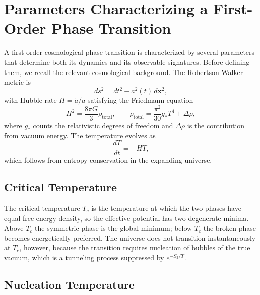 \chapter{Parameters Characterizing a First-Order Phase Transition}
\label{ch:phase-transition-parameters}

A first-order cosmological phase transition is characterized by several
parameters that determine both its dynamics and its observable
signatures. Before defining them, we recall the relevant cosmological
background. The Robertson-Walker metric is
\begin{equation}
	ds^2 = dt^2 - a^2(t)\,d\mathbf{x}^2,
\end{equation}
with Hubble rate $H = \dot a/a$ satisfying the Friedmann equation
\begin{equation}
	H^2 = \frac{8\pi G}{3}\rho_{\text{total}},
	\qquad
	\rho_{\text{total}} = \frac{\pi^2}{30}g_* T^4 + \Delta\rho,
\end{equation}
where $g_*$ counts the relativistic degrees of freedom and $\Delta\rho$
is the contribution from vacuum energy. The temperature evolves as
\begin{equation}
	\frac{dT}{dt} = -HT,
	\label{eq:reference_temperature}
\end{equation}
which follows from entropy conservation in the expanding universe.

\section{Critical Temperature}

The critical temperature $T_c$ is the temperature at which the two
phases have equal free energy density, so the effective potential has
two degenerate minima. Above $T_c$ the symmetric phase is the global
minimum; below $T_c$ the broken phase becomes energetically preferred.
The universe does not transition instantaneously at $T_c$, however,
because the transition requires nucleation of bubbles of the true
vacuum, which is a tunneling process suppressed by $e^{-S_3/T}$.


\section{Nucleation Temperature}

